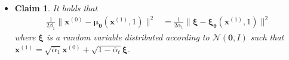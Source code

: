 \documentclass[10pt]{article}
\newtheorem{claim}[lemma]{Claim}
\newcommand{\ve}[1]{\mathbf{#1}}
\newcommand{\ves}[1]{\boldsymbol{#1}}
\newcommand{\mcal}[1]{\mathcal{#1}}
\begin{document}
\begin{itemize}
\begin{proof}
\begin{align*}
  L_{t-1} - C 
  &= E_{\ve{x}^{(0)} \sim q, \ves{\xi} \sim \mcal{N}(\ve{0}, I)} \bigg[\frac{1}{2\beta_t} \bigg\| 
    \frac{1}{\sqrt{\alpha_t}}  \frac{\beta_t}{\sqrt{1 - \overline{\alpha}_t}} \ves{\xi}
    - \frac{1}{\sqrt{\alpha_t}}  \frac{\beta_t}{\sqrt{1 - \overline{\alpha}_t}} \ves{\xi}_{\ves{\theta}}(\ve{x}^{(t-1)}, t)
  \bigg\|^2 \bigg] \\
  &= E_{\ve{x}^{(0)} \sim q, \ves{\xi} \sim \mcal{N}(\ve{0}, I)} \bigg[ \frac{1}{2\beta_t} \frac{\beta_t^2}{\alpha_t (1 - \overline{\alpha}_t)} \big\| \ves{\xi} - \ves{\xi}_{\ves{\theta}}(\ve{x}^{(t)},t) \big\|^2  \bigg] \\
  &= E_{\ve{x}^{(0)} \sim q, \ves{\xi} \sim \mcal{N}(\ve{0}, I)} \bigg[ \frac{\beta_t}{2 \alpha_t (1 - \overline{\alpha}_t)} \big\| \ves{\xi} - \ves{\xi}_{\ves{\theta}}(\ve{x}^{(t)},t) \big\|^2  \bigg] \\
  &= E_{\ve{x}^{(0)} \sim q, \ves{\xi} \sim \mcal{N}(\ve{0}, I)} \bigg[ \frac{\beta_t}{2 \alpha_t (1 - \overline{\alpha}_t)} \big\| \ves{\xi} - \ves{\xi}_{\ves{\theta}}(\sqrt{\overline{\alpha}_t}\ve{x}^{(0)} + \sqrt{1 - \overline{\alpha}_t}\ves{\xi},t) \big\|^2  \bigg]
\end{align*}
as required.
\end{proof}

\item \begin{claim} \label{ddpm-l0-rewrite}
It holds that
\begin{align*}
\frac{1}{2\beta_1} \big\| \ve{x}^{(0)} - \ves{\mu}_{\ves{\theta}}(\ve{x}^{(1)}, 1) \big\|^2
&= \frac{1}{2\alpha_1} \big\| \ves{\xi} - \ves{\xi}_{\ves{\theta}}(\ve{x}^{(1)},1) \big\|^2
\end{align*}
where $\ves{\xi}$ is a random variable distributed according to $\mcal{N}(\ve{0},I)$ such that $\ve{x}^{(1)} = \sqrt{\overline{\alpha}_1} \ve{x}^{(0)} + \sqrt{1 - \overline{\alpha}_t} \ves{\xi}$.
\end{claim}


\end{itemize}
\end{document}
